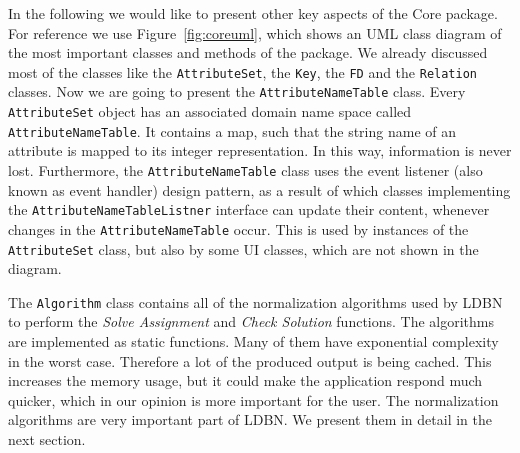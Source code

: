 In the following we would like to present other key aspects of the Core package. For reference we 
use Figure~\ref{fig:coreuml}, which shows an UML class diagram of the most important 
classes and methods of the package. We already discussed most of the classes like the \verb=AttributeSet=,
the \verb=Key=, the \verb=FD= and the \verb=Relation= classes. Now we are going to present the  
\verb=AttributeNameTable= class. Every \verb=AttributeSet= object has an associated domain name space called 
\verb=AttributeNameTable=. It contains a map, such that the string name of an attribute is mapped to its 
integer representation. In this way, information is never lost. 
Furthermore, the \verb=AttributeNameTable=
class uses the event listener (also known as event handler) design pattern, 
as a result of which classes implementing 
the \verb=AttributeNameTableListner= interface can update their content,
whenever changes in the \verb=AttributeNameTable= occur. This is used by instances of the 
\verb=AttributeSet= class, but also by some UI classes, which are not shown in the diagram. 

The \verb=Algorithm= class contains all of the normalization algorithms used by LDBN to perform 
the \textit{Solve Assignment} and \textit{Check Solution} functions. The algorithms are implemented 
as static functions. Many of them have exponential complexity in the worst
case. Therefore a lot of the produced output is being cached. This increases the
memory usage, but it could make the application respond much quicker, which
in our opinion is more important for the user. The normalization algorithms are very important 
part of LDBN. We present them in detail in the next section. 

